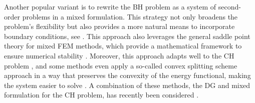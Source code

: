 \documentclass[11pt]{article}
\theoremstyle{remark}
\numberwithin{equation}{section}
\begin{document}
Another popular variant is to rewrite the BH problem as a system of second-order problems in a mixed formulation. This strategy not only broadens the problem's flexibility but also provides a more natural means to incorporate boundary conditions,
see \cite{falk1978approximation,
ciarlet1974mixed, gudi2008mixed, cheng2000some}. This approach also leverages the general saddle point theory for mixed
FEM methods, which provide a mathematical framework to ensure numerical stability \cite{john2016finite}.
Moreover, this approach adapts well to the CH problem \cite{wells2006discontinuous,feng2004error, valseth2021stable}, and some methods even apply a so-called convex splitting scheme approach in a way that preserves the convexity of the energy functional, making the
system easier to solve \cite{diegel2015analysis, brenner2018robust}.
A combination of these methods, the DG and mixed formulation for the CH problem, has recently been considered \cite{chave2016hybrid, medina2022stabilized}.
\end{document}
